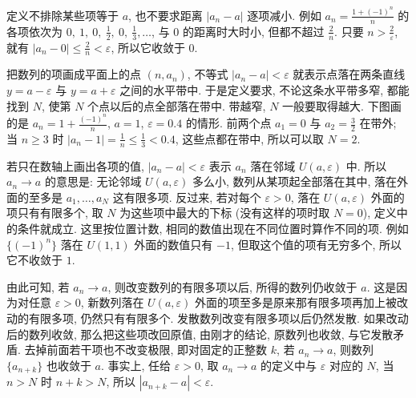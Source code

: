 \documentclass[UTF8,openany]{ctexbook}
\theoremstyle{chinesetextbook}
\begin{document}
定义不排除某些项等于 $a$, 也不要求距离 $|a_n-a|$ 逐项减小. 例如 $\displaystyle a_n=\frac{1+(-1)^n}n$ 的各项依次为 $\displaystyle0,\ 1,\ 0,\ \frac12,\ 0,\ \frac13,\ldots$, 与 $0$ 的距离时大时小, 但都不超过 $\displaystyle\frac2n$. 只要 $\displaystyle n>\frac2\varepsilon$, 就有 $\displaystyle|a_n-0|\le\frac2n<\varepsilon$, 所以它收敛于 $0$.

把数列的项画成平面上的点 $(n,a_n)$, 不等式 $|a_n-a|<\varepsilon$ 就表示点落在两条直线 $y=a-\varepsilon$ 与 $y=a+\varepsilon$ 之间的水平带中. 于是定义要求, 不论这条水平带多窄, 都能找到 $N$, 使第 $N$ 个点以后的点全部落在带中. 带越窄, $N$ 一般要取得越大. 下图画的是 $\displaystyle a_n=1+\frac{(-1)^n}n$, $a=1$, $\varepsilon=0.4$ 的情形. 前两个点 $a_1=0$ 与 $\displaystyle a_2=\frac32$ 在带外; 当 $n\ge3$ 时 $\displaystyle|a_n-1|=\frac1n\le\frac13<0.4$, 这些点都在带中, 所以可以取 $N=2$.
\begin{center}
\end{center}

若只在数轴上画出各项的值, $|a_n-a|<\varepsilon$ 表示 $a_n$ 落在邻域 $U(a,\varepsilon)$ 中. 所以 $a_n\to a$ 的意思是: 无论邻域 $U(a,\varepsilon)$ 多么小, 数列从某项起全部落在其中, 落在外面的至多是 $a_1,\ldots,a_N$ 这有限多项. 反过来, 若对每个 $\varepsilon>0$, 落在 $U(a,\varepsilon)$ 外面的项只有有限多个, 取 $N$ 为这些项中最大的下标 (没有这样的项时取 $N=0$), 定义中的条件就成立. 这里按位置计数, 相同的数值出现在不同位置时算作不同的项. 例如 $\{(-1)^n\}$ 落在 $U(1,1)$ 外面的数值只有 $-1$, 但取这个值的项有无穷多个, 所以它不收敛于 $1$.

由此可知, 若 $a_n\to a$, 则改变数列的有限多项以后, 所得的数列仍收敛于 $a$. 这是因为对任意 $\varepsilon>0$, 新数列落在 $U(a,\varepsilon)$ 外面的项至多是原来那有限多项再加上被改动的有限多项, 仍然只有有限多个. 发散数列改变有限多项以后仍然发散. 如果改动后的数列收敛, 那么把这些项改回原值, 由刚才的结论, 原数列也收敛, 与它发散矛盾. 去掉前面若干项也不改变极限, 即对固定的正整数 $k$, 若 $a_n\to a$, 则数列 $\{a_{n+k}\}$ 也收敛于 $a$. 事实上, 任给 $\varepsilon>0$, 取 $a_n\to a$ 的定义中与 $\varepsilon$ 对应的 $N$, 当 $n>N$ 时 $n+k>N$, 所以 $|a_{n+k}-a|<\varepsilon$.
\end{document}
